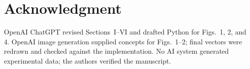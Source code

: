 \documentclass[journal]{IEEEtran}
\begin{document}
\section*{Acknowledgment}
OpenAI ChatGPT revised Sections~I--VI and drafted Python for Figs.~1, 2, and
4. OpenAI image generation supplied concepts for Figs.~1--2; final vectors
were redrawn and checked against the implementation. No AI system generated
experimental data; the authors verified the manuscript.



\end{document}
